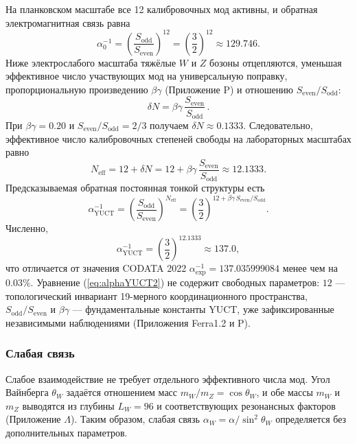 \documentclass[12pt,a4paper]{article}
\begin{document}
	На планковском масштабе все 12 калибровочных мод активны, и обратная электромагнитная связь равна
	\begin{equation}
		\alpha_0^{-1} = \left(\frac{S_{\mathrm{odd}}}{S_{\mathrm{even}}}\right)^{\!12}
		= \left(\frac{3}{2}\right)^{\!12} \approx 129.746 .
	\end{equation}
	Ниже электрослабого масштаба тяжёлые \(W\) и \(Z\) бозоны отцепляются, уменьшая эффективное число участвующих мод на универсальную поправку, пропорциональную произведению \(\beta\gamma\) (Приложение P) и отношению \(S_{\mathrm{even}}/S_{\mathrm{odd}}\):
	\begin{equation}
		\delta N = \beta\gamma\,\frac{S_{\mathrm{even}}}{S_{\mathrm{odd}}}\, .
		\label{eq:deltaN2}
	\end{equation}
	При \(\beta\gamma = 0.20\) и \(S_{\mathrm{even}}/S_{\mathrm{odd}} = 2/3\) получаем \(\delta N \approx 0.1333\). Следовательно, эффективное число калибровочных степеней свободы на лабораторных масштабах равно
	\begin{equation}
		N_{\mathrm{eff}} = 12 + \delta N = 12 + \beta\gamma\,\frac{S_{\mathrm{even}}}{S_{\mathrm{odd}}}
		\approx 12.1333 .
	\end{equation}
	Предсказываемая обратная постоянная тонкой структуры есть
	\begin{equation}
		\boxed{\alpha^{-1}_{\mathrm{YUCT}} =
			\left(\frac{S_{\mathrm{odd}}}{S_{\mathrm{even}}}\right)^{\!N_{\mathrm{eff}}}
			= \left(\frac{3}{2}\right)^{\!12 + \beta\gamma\,S_{\mathrm{even}}/S_{\mathrm{odd}}} } .
		\label{eq:alphaYUCT2}
	\end{equation}
	Численно,
	\[
	\alpha^{-1}_{\mathrm{YUCT}} = \left(\frac{3}{2}\right)^{\!12.1333} \approx 137.0 ,
	\]
	что отличается от значения CODATA 2022 \(\alpha^{-1}_{\mathrm{exp}} = 137.035999084\) менее чем на \(0.03\%\). Уравнение (\ref{eq:alphaYUCT2}) не содержит свободных параметров: \(12\) — топологический инвариант 19-мерного координационного пространства, \(S_{\mathrm{odd}}/S_{\mathrm{even}}\) и \(\beta\gamma\) — фундаментальные константы YUCT, уже зафиксированные независимыми наблюдениями (Приложения Ferra1.2 и P).
	
	\subsubsection{Слабая связь}
	Слабое взаимодействие не требует отдельного эффективного числа мод. Угол Вайнберга \(\theta_W\) задаётся отношением масс \(m_W/m_Z = \cos\theta_W\), и обе массы \(m_W\) и \(m_Z\) выводятся из глубины \(L_W = 96\) и соответствующих резонансных факторов (Приложение \(\Lambda\)). Таким образом, слабая связь \(\alpha_W = \alpha/\sin^2\theta_W\) определяется без дополнительных параметров.
	
\end{document}
